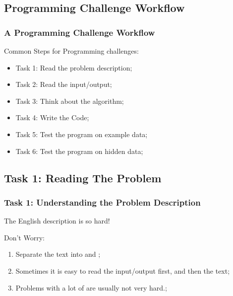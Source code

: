 \documentclass{beamer}
\begin{document}
\subsection{Programming Challenge Workflow}
\begin{frame}
  \frametitle{A Programming Challenge Workflow}

  Common Steps for Programming challenges:
  \bigskip

  \begin{itemize}
  \item Task 1: Read the problem description;
  \item Task 2: Read the input/output;
  \item Task 3: Think about the algorithm;
  \item Task 4: Write the Code;
  \item Task 5: Test the program on example data;
  \item Task 6: Test the program on hidden data;
  \end{itemize}
\end{frame}


\subsection{Task 1: Reading The Problem}
\begin{frame}
  \frametitle{Task 1: Understanding the Problem Description}

  The English description is so hard!

  \bigskip

  \begin{block}{Don't Worry:}
  \begin{enumerate}
  \item Separate the text into  and ;
  \item Sometimes it is easy to read the input/output first, and then
    the text;
  \item Problems with a lot of  are usually not very hard.;
  \end{enumerate}
  \end{block}
\end{frame}
\end{document}
